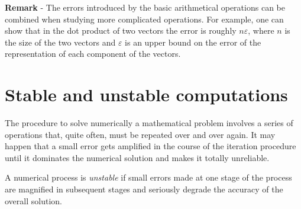 % 

\noindent 
\textbf{Remark} - The errors introduced by the basic arithmetical
operations can be combined when studying more complicated operations.
For example, one can show that in the dot product of two vectors the
error is roughly $n \varepsilon$, where $n$ is the size of the two vectors and
$\varepsilon$ is an upper bound on the error of the representation of each
component of the vectors.

\section{Stable and unstable computations}

The procedure to solve numerically a mathematical problem involves a
series of operations that, quite often, must be repeated over and over
again.    It may happen that a small error gets amplified in the
course of the iteration procedure until it dominates the numerical
solution and makes it totally unreliable.    

A numerical process is \textit{unstable} if small errors made at one
stage of the process are magnified in subsequent stages and seriously
degrade the accuracy of the overall solution.

